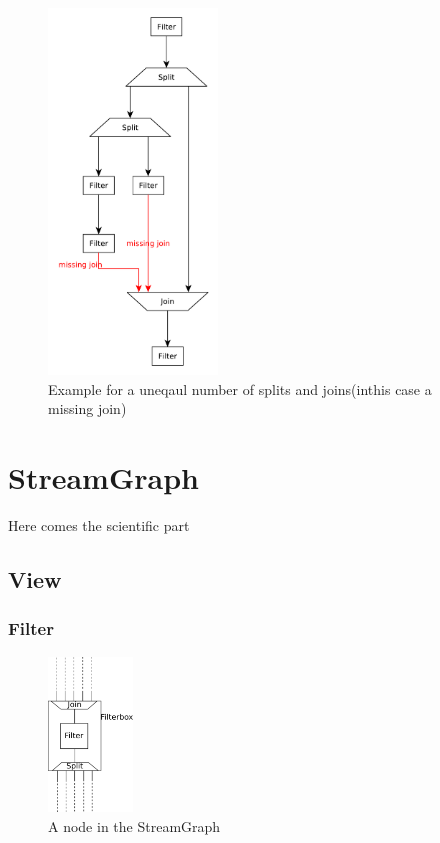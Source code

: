 \documentclass[journal]{IEEEtran}
\begin{document}
\begin{figure}[h]
	\centering
	\includegraphics[width=0.4\textwidth]{StreamItTopologyMissingJoin}
	\caption{Example for a uneqaul number of splits and joins(inthis case a missing join)}
	\label{fig_StreamIt_topology_missing_join}
\end{figure}


\section{StreamGraph}
\noindent Here comes the scientific part
\subsection{View}
\subsubsection{Filter}
\begin{figure}[h]
	\centering
	\includegraphics[width=0.2\textwidth]{FilterBoxGraphic}
	\caption{A node in the StreamGraph}
	\label{fig_filter_node}
\end{figure}
\end{document}
